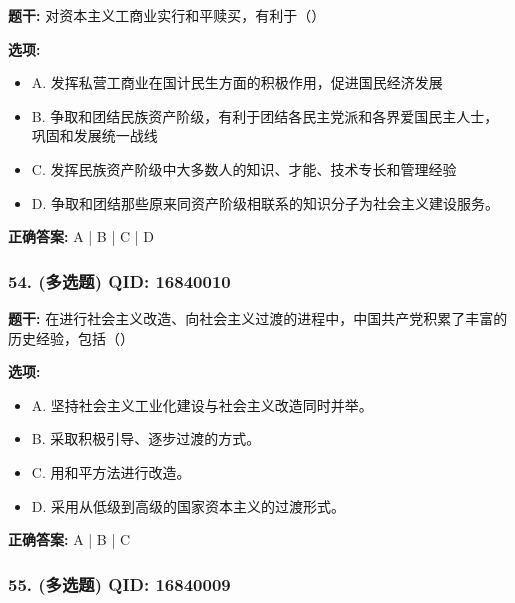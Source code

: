 \documentclass[12pt,UTF8]{ctexart}
\begin{document}
\textbf{题干:}
对资本主义工商业实行和平赎买，有利于（）

\textbf{选项:}
\begin{itemize}[leftmargin=*]

  \item A. 发挥私营工商业在国计民生方面的积极作用，促进国民经济发展

  \item B. 争取和团结民族资产阶级，有利于团结各民主党派和各界爱国民主人士，巩固和发展统一战线

  \item C. 发挥民族资产阶级中大多数人的知识、才能、技术专长和管理经验

  \item D. 争取和团结那些原来同资产阶级相联系的知识分子为社会主义建设服务。

\end{itemize}

\textbf{正确答案:}
A | B | C | D

\vspace{0.3em}\hrulefill\vspace{0.7em}

\subsubsection*{54. (多选题) \small QID: 16840010}

\textbf{题干:}
在进行社会主义改造、向社会主义过渡的进程中，中国共产党积累了丰富的历史经验，包括（）

\textbf{选项:}
\begin{itemize}[leftmargin=*]

  \item A. 坚持社会主义工业化建设与社会主义改造同时并举。

  \item B. 采取积极引导、逐步过渡的方式。

  \item C. 用和平方法进行改造。

  \item D. 采用从低级到高级的国家资本主义的过渡形式。

\end{itemize}

\textbf{正确答案:}
A | B | C

\vspace{0.3em}\hrulefill\vspace{0.7em}

\subsubsection*{55. (多选题) \small QID: 16840009}
\end{document}

